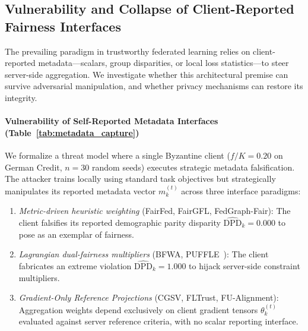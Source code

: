 \subsection{Vulnerability and Collapse of Client-Reported Fairness Interfaces}
\label{subsec:vulnerability}

The prevailing paradigm in trustworthy federated learning relies on client-reported metadata—scalars, group disparities, or local loss statistics—to steer server-side aggregation. We investigate whether this architectural premise can survive adversarial manipulation, and whether privacy mechanisms can restore its integrity.

\paragraph{Vulnerability of Self-Reported Metadata Interfaces (Table~\ref{tab:metadata_capture})}
We formalize a threat model where a single Byzantine client ($f/K = 0.20$ on German Credit, $n=30$ random seeds) executes strategic metadata falsification. The attacker trains locally using standard task objectives but strategically manipulates its reported metadata vector $m_k^{(t)}$ across three interface paradigms:
\begin{enumerate}[leftmargin=*]
    \item \textit{Metric-driven heuristic weighting} (FairFed, FairGFL, FedGraph-Fair): The client falsifies its reported demographic parity disparity $\widehat{\text{DPD}}_k = 0.000$ to pose as an exemplar of fairness.
    \item \textit{Lagrangian dual-fairness multipliers} (BFWA, PUFFLE~\citep{laguel2024federated}): The client fabricates an extreme violation $\widehat{\text{DPD}}_k = 1.000$ to hijack server-side constraint multipliers.
    \item \textit{Gradient-Only Reference Projections} (CGSV, FLTrust, FU-Alignment): Aggregation weights depend exclusively on client gradient tensors $\theta_k^{(t)}$ evaluated against server reference criteria, with no scalar reporting interface.
\end{enumerate}



